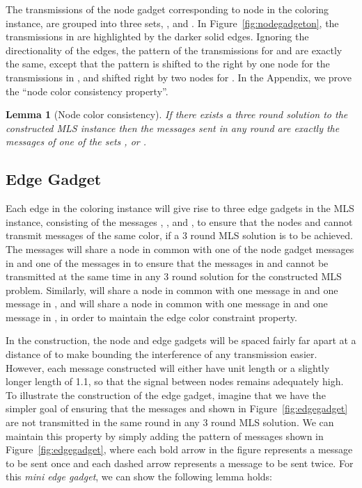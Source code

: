 \documentclass{article}
\newtheorem{lemma}{Lemma}
\begin{document}
The transmissions of the node gadget corresponding to node  in the coloring instance, are grouped into three sets, ,  and . In Figure~\ref{fig:nodegadgeton}, the transmissions in  are highlighted by the darker solid edges.  Ignoring the directionality of the edges, the pattern of the transmissions for  and  are exactly the same, except that the pattern is shifted to the right by one node for the transmissions in , and shifted right by two nodes for . In the Appendix, we prove the ``node color consistency property''.

\begin{lemma}[Node color consistency]
If there exists a three round solution to the constructed MLS instance then the messages sent in any round are exactly the messages of one of the sets ,  or .
\end{lemma}


\subsection{Edge Gadget}
Each edge  in the coloring instance will give rise to three edge gadgets in the MLS instance, consisting of the messages , , and , to ensure that the nodes  and  cannot transmit messages of the same color, if a 3 round MLS solution is to be achieved.  The  messages will share a node in common with one of the node gadget messages in  and one of the messages in  to ensure that the messages in  and  cannot be transmitted at the same time in any 3 round solution for the constructed MLS problem.  Similarly,  will share a node in common with one message in  and one message in , and  will share a node in common with one message in  and one message in , in order to maintain the edge color constraint property.

In the construction, the node and edge gadgets will be spaced fairly far apart at a distance of  to make bounding the interference of any transmission easier.  However, each message constructed will either have unit length or a slightly longer length of 1.1, so that the signal between nodes remains adequately high.  To illustrate the construction of the edge gadget, imagine that we have the simpler goal of ensuring that the messages  and  shown in Figure~\ref{fig:edgegadget} are not transmitted in the same round in any 3 round MLS solution.  We can maintain this property by simply adding the pattern of messages shown in Figure~\ref{fig:edgegadget}, where each bold arrow in the figure represents a message to be sent once and each dashed arrow represents a message to be sent twice.  For this \emph{mini edge gadget}, we can show the following lemma holds:
\end{document}
